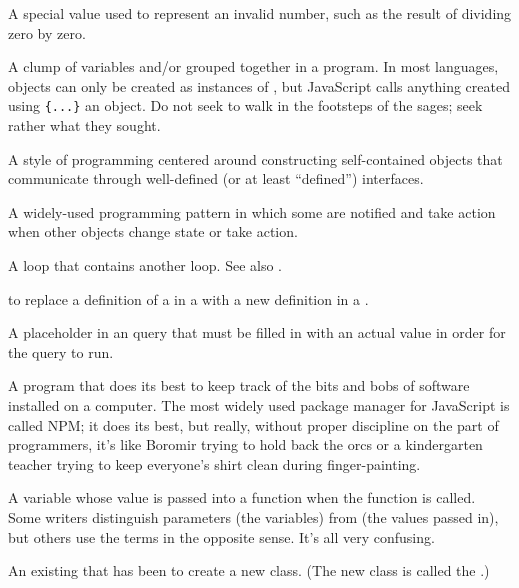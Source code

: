 \begin{description}
A special value used to represent an invalid number,
such as the result of dividing zero by zero.

A clump of variables and/or  grouped together in a
program. In most languages, objects can only be created as instances of
, but JavaScript calls anything created using \texttt{\{...\}} an
object. Do not seek to walk in the footsteps of the sages; seek rather what
they sought.

A style of programming centered around constructing self-contained objects
that communicate through well-defined (or at least ``defined'') interfaces.

A widely-used programming pattern in which some  are
notified and take action when other objects change state or take action.

A loop that contains another loop.
See also .

to replace a definition of a  in a 
with a new definition in a .

A placeholder in an  query that must be filled in with an actual
value in order for the query to run.

A program that does its best to keep track of the bits and bobs of software
installed on a computer. The most widely used package manager for JavaScript
is called NPM; it does its best, but really, without proper discipline on the
part of programmers, it's like Boromir trying to hold back the orcs or a
kindergarten teacher trying to keep everyone's shirt clean during
finger-painting.

A variable whose value is passed into a function when the function is called.
Some writers distinguish parameters (the variables) from
 (the values passed in), but others use the terms in
the opposite sense. It's all very confusing.

An existing  that has been  to create a
new class. (The new class is called the .)


\end{description}
